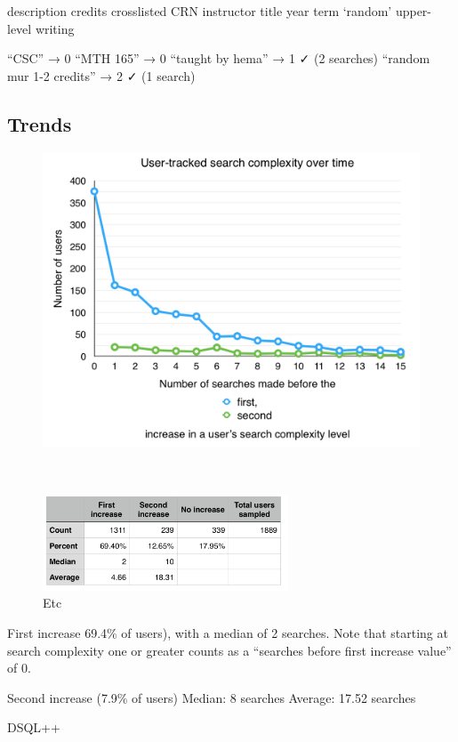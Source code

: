 description
credits
crosslisted
CRN
instructor
title
year
term
‘random’
upper-level writing

“CSC” → 0
“MTH 165” → 0
“taught by hema” → 1   ✓    (2 searches) 
“random mur 1-2 credits” → 2   ✓    (1 search) 


\subsection{Trends}

\begin{figure}
  \centering

  \includegraphics[width=1.00\textwidth]{images/graph/search_dt}

  \\
  \vspace{5pt}

  \includegraphics[width=0.65\textwidth]{images/table/search_dt}

  \caption{Etc}
  \label{fig:searchtypes}
\end{figure}

First increase 69.4\% of users), with a median of 2 searches.
Note that starting at search complexity one or greater counts as a ``searches before first increase value'' of 0.

Second increase (7.9\% of users)
Median: 8 searches
Average: 17.52 searches

DSQL++